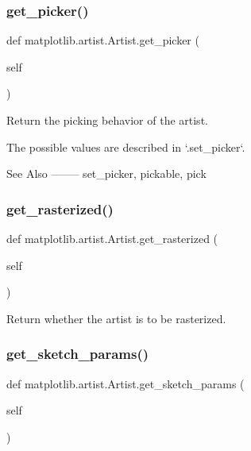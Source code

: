 \subsubsection{\texorpdfstring{get\+\_\+picker()}{get\_picker()}}
{\footnotesize\ttfamily def matplotlib.\+artist.\+Artist.\+get\+\_\+picker (\begin{DoxyParamCaption}\item[{}]{self }\end{DoxyParamCaption})}

\begin{DoxyVerb}Return the picking behavior of the artist.

The possible values are described in `.set_picker`.

See Also
--------
set_picker, pickable, pick
\end{DoxyVerb}
 \mbox{\label{classmatplotlib_1_1artist_1_1Artist_aa4ed081e04ee89fd45e5c959018e9031}} 
\subsubsection{\texorpdfstring{get\+\_\+rasterized()}{get\_rasterized()}}
{\footnotesize\ttfamily def matplotlib.\+artist.\+Artist.\+get\+\_\+rasterized (\begin{DoxyParamCaption}\item[{}]{self }\end{DoxyParamCaption})}

\begin{DoxyVerb}Return whether the artist is to be rasterized.\end{DoxyVerb}
 \mbox{\label{classmatplotlib_1_1artist_1_1Artist_a73824b2b9468d747236484b747369e41}} 
\subsubsection{\texorpdfstring{get\+\_\+sketch\+\_\+params()}{get\_sketch\_params()}}
{\footnotesize\ttfamily def matplotlib.\+artist.\+Artist.\+get\+\_\+sketch\+\_\+params (\begin{DoxyParamCaption}\item[{}]{self }\end{DoxyParamCaption})}

